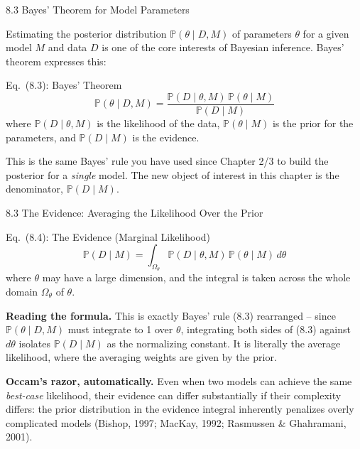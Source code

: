 \documentclass[aspectratio=169,10pt]{beamer}
\begin{document}
\begin{frame}[allowframebreaks]{8.3 Bayes' Theorem for Model Parameters}

Estimating the posterior distribution $\mathbb{P}(\theta \mid D, M)$ of parameters $\theta$ for a given model $M$ and data $D$ is one of the core interests of Bayesian inference. Bayes' theorem expresses this:

\begin{block}{Eq.\ (8.3): Bayes' Theorem}
\[
\mathbb{P}(\theta \mid D, M) = \frac{\mathbb{P}(D \mid \theta, M)\, \mathbb{P}(\theta \mid M)}{\mathbb{P}(D \mid M)}
\]
where $\mathbb{P}(D\mid\theta,M)$ is the likelihood of the data, $\mathbb{P}(\theta\mid M)$ is the prior for the parameters, and $\mathbb{P}(D\mid M)$ is the evidence.
\end{block}

This is the same Bayes' rule you have used since Chapter 2/3 to build the posterior for a \emph{single} model. The new object of interest in this chapter is the denominator, $\mathbb{P}(D\mid M)$.

\end{frame}

\begin{frame}[allowframebreaks]{8.3 The Evidence: Averaging the Likelihood Over the Prior}

\begin{block}{Eq.\ (8.4): The Evidence (Marginal Likelihood)}
\[
\mathbb{P}(D \mid M) = \int_{\Omega_\theta} \mathbb{P}(D \mid \theta, M)\, \mathbb{P}(\theta \mid M)\, d\theta
\]
where $\theta$ may have a large dimension, and the integral is taken across the whole domain $\Omega_\theta$ of $\theta$.
\end{block}

\textbf{Reading the formula.} This is exactly Bayes' rule (8.3) rearranged -- since $\mathbb{P}(\theta\mid D,M)$ must integrate to 1 over $\theta$, integrating both sides of (8.3) against $d\theta$ isolates $\mathbb{P}(D\mid M)$ as the normalizing constant. It is literally the average likelihood, where the averaging weights are given by the prior.

\textbf{Occam's razor, automatically.} Even when two models can achieve the same \emph{best-case} likelihood, their evidence can differ substantially if their complexity differs: the prior distribution in the evidence integral inherently penalizes overly complicated models (Bishop, 1997; MacKay, 1992; Rasmussen \& Ghahramani, 2001).

\end{frame}
\end{document}
